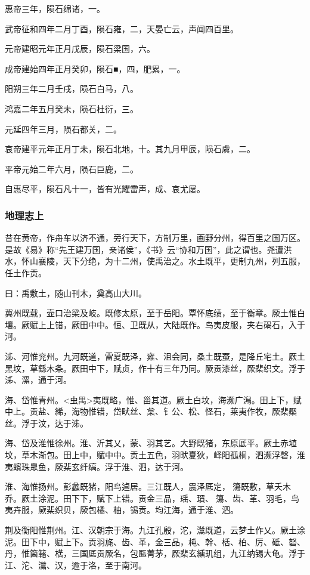 \documentclass[]{article}
\begin{document}
惠帝三年，陨石绵诸，一。

武帝征和四年二月丁酉，陨石雍，二，天晏亡云，声闻四百里。

元帝建昭元年正月戊辰，陨石梁国，六。

成帝建始四年正月癸卯，陨石■，四，肥累，一。

阳朔三年二月壬戌，陨石白马，八。

鸿嘉二年五月癸未，陨石杜衍，三。

元延四年三月，陨石都关，二。

哀帝建平元年正月丁未，陨石北地，十。其九月甲辰，陨石虞，二。

平帝元始二年六月，陨石巨鹿，二。

自惠尽平，陨石凡十一，皆有光耀雷声，成、哀尤屡。

\hypertarget{header-n2506}{%
\subsubsection{地理志上}\label{header-n2506}}

昔在黄帝，作舟车以济不通，旁行天下，方制万里，画野分州，得百里之国万区。是故《易》称``先王建万国，亲诸侯''，《书》云``协和万国''，此之谓也。尧遭洪水，怀山襄陵，天下分绝，为十二州，使禹治之。水土既平，更制九州，列五服，任土作贡。

曰：禹敷土，随山刊木，奠高山大川。

冀州既载，壶口治梁及岐。既修太原，至于岳阳。覃怀底绩，至于衡章。厥土惟白壤。厥赋上上错，厥田中中。恒、卫既从，大陆既作。鸟夷皮服，夹右碣石，入于河。

泲、河惟兖州。九河既道，雷夏既泽，雍、沮会同，桑土既蚕，是降丘宅土。厥土黑坟，草繇木条。厥田中下，赋贞，作十有三年乃同。厥贡漆丝，厥棐织文。浮于泲、漯，通于河。

海、岱惟青州。\textless{}虫禺\textgreater{}夷既略，惟、甾其道。厥土白坟，海濒广澙。田上下，赋中上。贡盐、絺，海物惟错，岱畎丝、枲、钅公、松、怪石，莱夷作牧，厥棐檿丝。浮于汶，达于泲。

海、岱及淮惟徐州。淮、沂其乂，蒙、羽其艺。大野既猪，东原厎平。厥土赤埴坟，草木渐包。田上中，赋中中。贡土五色，羽畎夏狄，峄阳孤桐，泗濒浮磬，淮夷蠙珠臮鱼，厥棐玄纤缟。浮于淮、泗，达于河。

淮、海惟扬州。彭蠡既猪，阳鸟逌居。三江既人，震泽厎定，簜既敷，草夭木乔。厥土涂泥。田下下，赋下上错。贡金三品，瑶、瑻、簜、齿、革、羽毛，鸟夷卉服，厥棐织贝，厥包橘、柚，锡贡。均江海，通于淮、泗。

荆及衡阳惟荆州。江、汉朝宗于海。九江孔殷，沱，灊既道，云梦土作乂。厥土涂泥。田下中，赋上下。贡羽旄、齿、革，金三品，杶、幹、栝、柏、厉、砥、砮、丹，惟箘簵、楛，三国厎贡厥名，包匦菁茅，厥棐玄纁玑组，九江纳锡大龟。浮于江、沱、灊、汉，逾于洛，至于南河。
\end{document}

